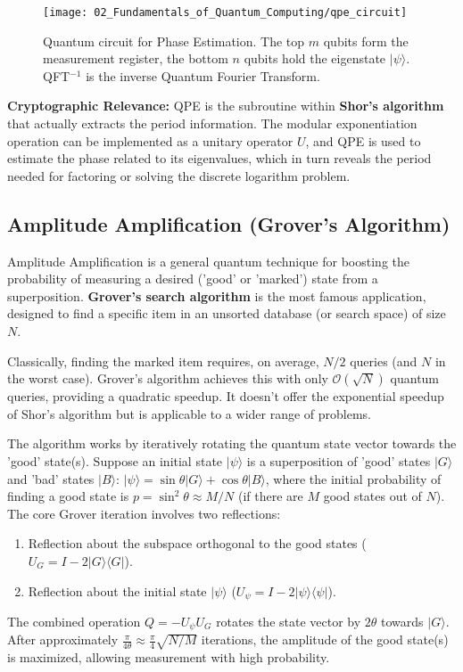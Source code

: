 \begin{figure}[h]
\centering
\texttt{[image: 02\_Fundamentals\_of\_Quantum\_Computing/qpe\_circuit]}
\caption{Quantum circuit for Phase Estimation. The top $m$ qubits form the measurement register, the bottom $n$ qubits hold the eigenstate $|\psi\rangle$. QFT$^{-1}$ is the inverse Quantum Fourier Transform.}
\label{fig:qpe_circuit}
\end{figure}

\textbf{Cryptographic Relevance:} QPE is the subroutine within \textbf{Shor's algorithm} that actually extracts the period information. The modular exponentiation operation can be implemented as a unitary operator $U$, and QPE is used to estimate the phase related to its eigenvalues, which in turn reveals the period needed for factoring or solving the discrete logarithm problem.

\subsection{Amplitude Amplification (Grover's Algorithm)}\label{subsec:amplitude_amp}
Amplitude Amplification is a general quantum technique for boosting the probability of measuring a desired ('good' or 'marked') state from a superposition. \textbf{Grover's search algorithm} is the most famous application, designed to find a specific item in an unsorted database (or search space) of size $N$.

Classically, finding the marked item requires, on average, $N/2$ queries (and $N$ in the worst case). Grover's algorithm achieves this with only $\mathcal{O}(\sqrt{N})$ quantum queries, providing a quadratic speedup. It doesn't offer the exponential speedup of Shor's algorithm but is applicable to a wider range of problems.

The algorithm works by iteratively rotating the quantum state vector towards the 'good' state(s). Suppose an initial state $|\psi\rangle$ is a superposition of 'good' states $|G\rangle$ and 'bad' states $|B\rangle$: $|\psi\rangle = \sin\theta|G\rangle + \cos\theta|B\rangle$, where the initial probability of finding a good state is $p = \sin^2\theta \approx M/N$ (if there are $M$ good states out of $N$). The core Grover iteration involves two reflections:
\begin{enumerate}
    \item Reflection about the subspace orthogonal to the good states ($U_G = I - 2|G\rangle\langle G|$).
    \item Reflection about the initial state $|\psi\rangle$ ($U_\psi = I - 2|\psi\rangle\langle\psi|$).
\end{enumerate}
The combined operation $Q = -U_\psi U_G$ rotates the state vector by $2\theta$ towards $|G\rangle$. After approximately $\frac{\pi}{4\theta} \approx \frac{\pi}{4}\sqrt{N/M}$ iterations, the amplitude of the good state(s) is maximized, allowing measurement with high probability.

